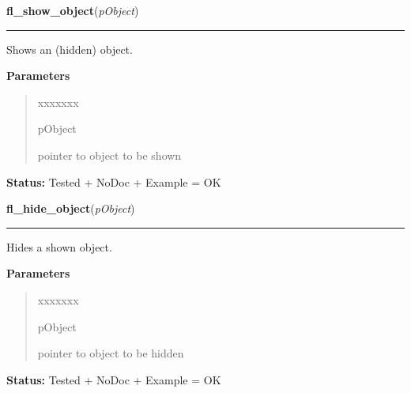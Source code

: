 \hspace{.8\funcindent}\begin{boxedminipage}{\funcwidth}

    \raggedright \textbf{fl\_show\_object}(\textit{pObject})

    \vspace{-1.5ex}

    \rule{\textwidth}{0.5\fboxrule}
\setlength{\parskip}{2ex}
    Shows an (hidden) object.

\setlength{\parskip}{1ex}
      \textbf{Parameters}
      \vspace{-1ex}

      \begin{quote}
        \begin{Ventry}{xxxxxxx}

          \item[pObject]

          pointer to object to be shown

        \end{Ventry}

      \end{quote}

\textbf{Status:} Tested + NoDoc + Example = OK



    \end{boxedminipage}

    \label{xformslib:library:fl_hide_object}

    \vspace{0.5ex}

\hspace{.8\funcindent}\begin{boxedminipage}{\funcwidth}

    \raggedright \textbf{fl\_hide\_object}(\textit{pObject})

    \vspace{-1.5ex}

    \rule{\textwidth}{0.5\fboxrule}
\setlength{\parskip}{2ex}
    Hides a shown object.

\setlength{\parskip}{1ex}
      \textbf{Parameters}
      \vspace{-1ex}

      \begin{quote}
        \begin{Ventry}{xxxxxxx}

          \item[pObject]

          pointer to object to be hidden

        \end{Ventry}

      \end{quote}

\textbf{Status:} Tested + NoDoc + Example = OK



    \end{boxedminipage}

